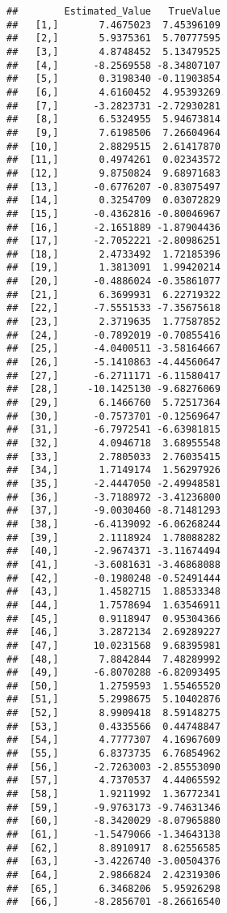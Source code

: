 \documentclass[
]{article}
\begin{document}
\begin{verbatim}
##        Estimated_Value   TrueValue
##   [1,]       7.4675023  7.45396109
##   [2,]       5.9375361  5.70777595
##   [3,]       4.8748452  5.13479525
##   [4,]      -8.2569558 -8.34807107
##   [5,]       0.3198340 -0.11903854
##   [6,]       4.6160452  4.95393269
##   [7,]      -3.2823731 -2.72930281
##   [8,]       6.5324955  5.94673814
##   [9,]       7.6198506  7.26604964
##  [10,]       2.8829515  2.61417870
##  [11,]       0.4974261  0.02343572
##  [12,]       9.8750824  9.68971683
##  [13,]      -0.6776207 -0.83075497
##  [14,]       0.3254709  0.03072829
##  [15,]      -0.4362816 -0.80046967
##  [16,]      -2.1651889 -1.87904436
##  [17,]      -2.7052221 -2.80986251
##  [18,]       2.4733492  1.72185396
##  [19,]       1.3813091  1.99420214
##  [20,]      -0.4886024 -0.35861077
##  [21,]       6.3699931  6.22719322
##  [22,]      -7.5551533 -7.35675618
##  [23,]       2.3719635  1.77587852
##  [24,]      -0.7892019 -0.70855416
##  [25,]      -4.0400511 -3.58164667
##  [26,]      -5.1410863 -4.44560647
##  [27,]      -6.2711171 -6.11580417
##  [28,]     -10.1425130 -9.68276069
##  [29,]       6.1466760  5.72517364
##  [30,]      -0.7573701 -0.12569647
##  [31,]      -6.7972541 -6.63981815
##  [32,]       4.0946718  3.68955548
##  [33,]       2.7805033  2.76035415
##  [34,]       1.7149174  1.56297926
##  [35,]      -2.4447050 -2.49948581
##  [36,]      -3.7188972 -3.41236800
##  [37,]      -9.0030460 -8.71481293
##  [38,]      -6.4139092 -6.06268244
##  [39,]       2.1118924  1.78088282
##  [40,]      -2.9674371 -3.11674494
##  [41,]      -3.6081631 -3.46868088
##  [42,]      -0.1980248 -0.52491444
##  [43,]       1.4582715  1.88533348
##  [44,]       1.7578694  1.63546911
##  [45,]       0.9118947  0.95304366
##  [46,]       3.2872134  2.69289227
##  [47,]      10.0231568  9.68395981
##  [48,]       7.8842844  7.48289992
##  [49,]      -6.8070288 -6.82093495
##  [50,]       1.2759593  1.55465520
##  [51,]       5.2998675  5.10402876
##  [52,]       8.9909418  8.59148275
##  [53,]       0.4335566  0.44748847
##  [54,]       4.7777307  4.16967609
##  [55,]       6.8373735  6.76854962
##  [56,]      -2.7263003 -2.85553090
##  [57,]       4.7370537  4.44065592
##  [58,]       1.9211992  1.36772341
##  [59,]      -9.9763173 -9.74631346
##  [60,]      -8.3420029 -8.07965880
##  [61,]      -1.5479066 -1.34643138
##  [62,]       8.8910917  8.62556585
##  [63,]      -3.4226740 -3.00504376
##  [64,]       2.9866824  2.42319306
##  [65,]       6.3468206  5.95926298
##  [66,]      -8.2856701 -8.26616540

\end{verbatim}
\end{document}
